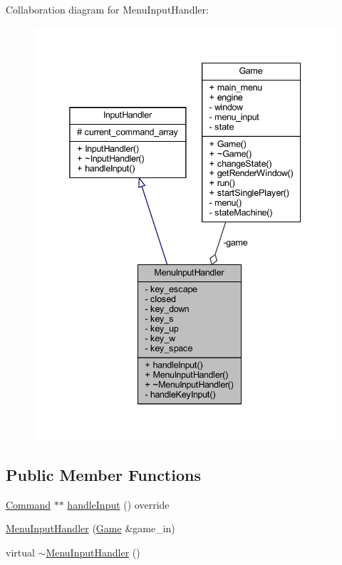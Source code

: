 Collaboration diagram for Menu\+Input\+Handler\+:
\nopagebreak
\begin{figure}[H]
\begin{center}
\leavevmode
\includegraphics[width=338pt]{class_menu_input_handler__coll__graph}
\end{center}
\end{figure}
\subsection*{Public Member Functions}
\begin{DoxyCompactItemize}
\item 
\hyperlink{class_command}{Command} $\ast$$\ast$ \hyperlink{class_menu_input_handler_a60840342f557c79f31097aa713ba7a37}{handle\+Input} () override
\item 
\hyperlink{class_menu_input_handler_ae0a666273bb8b76cea8352e600b987fc}{Menu\+Input\+Handler} (\hyperlink{class_game}{Game} \&game\+\_\+in)
\item 
virtual \hyperlink{class_menu_input_handler_a283ab0103c42ef398b7d632dd99d1bee}{$\sim$\+Menu\+Input\+Handler} ()
\end{DoxyCompactItemize}
